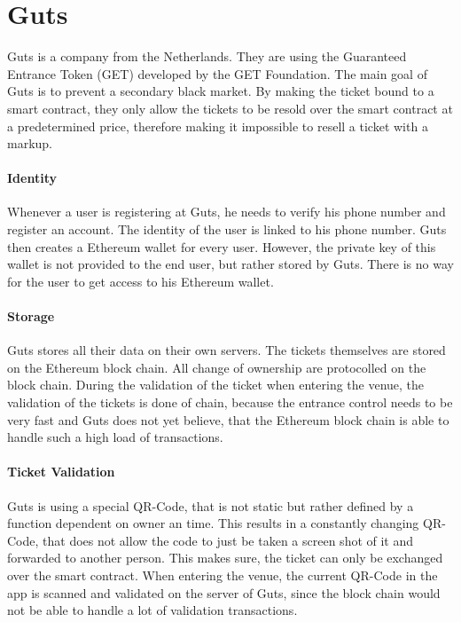 
\section{Guts}
Guts \cite{GET_PROTOCOL} is a company from the Netherlands. They are using the Guaranteed Entrance Token (GET) developed by the GET Foundation. The main goal of Guts is to prevent a secondary black market. By making the ticket bound to a smart contract, they only allow the tickets to be resold over the smart contract at a predetermined price, therefore making it impossible to resell a ticket with a markup.

\paragraph{Identity}
Whenever a user is registering at Guts, he needs to verify his phone number and register an account. The identity of the user is linked to his phone number. Guts then creates a Ethereum wallet for every user. However, the private key of this wallet is not provided to the end user, but rather stored by Guts. There is no way for the user to get access to his Ethereum wallet. 


\paragraph{Storage}
Guts stores all their data on their own servers. The tickets themselves are stored on the Ethereum block chain. All change of ownership are protocolled on the block chain. During the validation of the ticket when entering the venue, the validation of the tickets is done of chain, because the entrance control needs to be very fast and Guts does not yet believe, that the Ethereum block chain is able to handle such a high load of transactions.

\paragraph{Ticket Validation}
Guts is using a special QR-Code, that is not static but rather defined by a function dependent on owner an time. This results in a constantly changing QR-Code, that does not allow the code to just be taken a screen shot of it and forwarded to another person. This makes sure, the ticket can only be exchanged over the smart contract. When entering the venue, the current QR-Code in the app is scanned and validated on the server of Guts, since the block chain would not be able to handle a lot of validation transactions.


